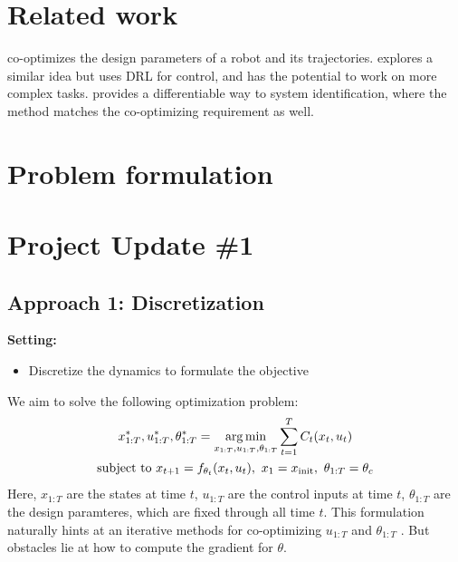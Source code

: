 \documentclass[conference]{IEEEtran}
\begin{document}
\section{Related work}



\cite{spielberg2017functional} co-optimizes the design parameters of a robot and its trajectories.
\cite{ha2019reinforcement} explores a similar idea but uses DRL for control, and has the potential to work on more complex tasks.
\cite{amos2018differentiable} provides a differentiable way to system identification, where the method matches the co-optimizing requirement as well.


\section{Problem formulation}


\section{Project Update \#1}

\subsection{Approach 1: Discretization}


\textbf{Setting:}
\vspace{-5pt}
\begin{itemize}
    \setlength{\itemsep}{0pt}
    \setlength{\parsep}{0pt}
    \setlength{\parskip}{0pt}
    \item Discretize the dynamics to formulate the objective
\end{itemize}


We aim to solve the following optimization problem:
\begin{gather*}
x_{1:T}^*, u_{1:T}^*, \theta_{1:T}^* = \operatorname*{arg\,min}\limits_{x_{1:T},u_{1:T},\theta_{1:T}}  \sum\limits_{t=1}^{T}  C_t(x_t,u_t) \\
\text{subject to~} x_{t+1} = f_{\theta_t}(x_t,u_t),~x_1 = x_{\text{init}},~\theta_{1:T} = \theta_c
\end{gather*}
Here, $x_{1:T}$ are the states at time $t$, $u_{1:T}$ are the control inputs at time $t$, $\theta_{1:T}$ are the design paramteres, which are fixed through all time $t$. This formulation naturally hints at an iterative methods for co-optimizing $u_{1:T}$ and $\theta_{1:T}$ . But obstacles lie at how to compute the gradient for $\theta$. 
\end{document}

